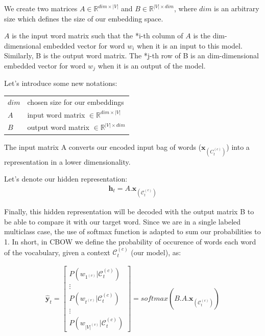 We create two matrices $A \in \mathbb{R}^{dim \times |V|}$ and $B \in \mathbb{R}^{|V| \times dim}$, where $dim$ is an arbitrary size which defines the size of our embedding space.

$A$ is the input word matrix such that the *i-th column of $A$ is the dim-dimensional embedded vector for word $w_{i}$ when it is an input to this model. 
Similarly, B is the output word matrix. The *j-th row of B is an dim-dimensional embedded vector for word $w_j$ when it is an output of the model. 



Let's introduce some new notations:

{\ttfamily
\begin{table}[H]
    \centering
    \begin{tabular}{ll}
        \toprule
        $dim$ 				& chosen size for our embeddings \\
        $A$ 				& input word matrix $\in \mathbb{R}^{dim \times |V|}$ \\
        $B$ 				& output word matrix $\in \mathbb{R}^{|V| \times dim}$ \\
        \bottomrule
    \end{tabular}
\end{table}
}

The input matrix A converts our encoded input bag of words ($\mathbf{x}_{(C_t^{(c)})}$) into a representation in a lower dimensionality.

Let's denote our hidden representation:
\begin{align}
 \mathbf{h}_t = A.\mathbf{x}_{(\mathcal{C}_t^{(c)})}
\end{align}

Finally, this hidden representation will be decoded with the output matrix B to be able to compare it with our target word. Since we are in a single labeled multiclass case, the use of softmax function is adapted to sum our probabilities to 1. In short, in CBOW we define the probability of occurence of words each word of the vocabulary, given a context $\mathcal{C}_t^{(c)}$ (our model), as:

\begin{align}
 \mathbf{\hat y}_t = 
	\begin{bmatrix} 
		P(w_{1^{(v)}} | \mathcal{C}_t^{(c)}) \\
		\vdots \\
		P(w_{t^{(v)}} | \mathcal{C}_t^{(c)})\\
		\vdots \\
		P(w_{|V|^{(v)}} | \mathcal{C}_t^{(c)})
	\end{bmatrix} = 
	softmax(B.A.\mathbf{x}_{(\mathcal{C}_t^{(c)})})
\end{align}

